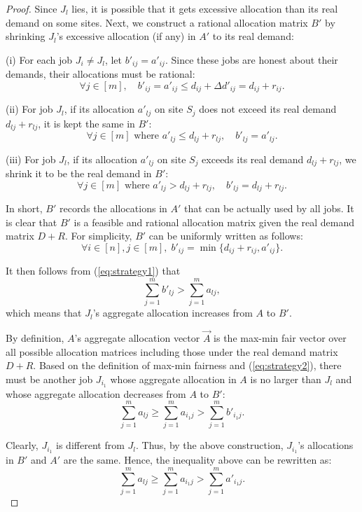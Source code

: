 \begin{proof}
Since $J_l$ lies, it is possible that it gets excessive allocation than its real demand on some sites. Next, we construct a rational allocation matrix $B'$ by shrinking $J_l$'s excessive allocation (if any) in $A'$ to its real demand:

(i) For each job $J_i \neq J_l$, let $b'_{ij} = a'_{ij}$. Since these jobs are honest about their demands, their allocations must be rational: 
$$\forall j \in [m], \quad b'_{ij} = a'_{ij} \leq d_{ij}+\Delta d'_{ij} = d_{ij}+ r_{ij}.$$

(ii) For job $J_l$, if its allocation $a'_{lj}$ on site $S_j$ does not exceed its real demand $d_{lj} + r_{lj}$, it is kept the same in $B'$:
$$\forall j \in[m] \text{~where~} a'_{lj} \leq d_{lj} + r_{lj}, \quad b'_{lj} = a'_{lj}.$$
    
(iii) For job $J_l$, if its allocation $a'_{lj}$ on site $S_j$ exceeds its real demand $d_{lj} + r_{lj}$, we shrink it to be the real demand in $B'$:
$$\forall j \in [m] \text{~where~} a'_{lj} > d_{lj} + r_{lj}, \quad b'_{lj} = d_{lj} + r_{lj}.$$

In short, $B'$ records the allocations in $A'$ that can be actually used by all jobs. It is clear that $B'$ is a feasible and rational allocation matrix given the real demand matrix $D + R$.
For simplicity, $B'$ can be uniformly written as follows:
$$
\forall i \in [n], j \in [m], \; b'_{ij} = \min\{d_{ij}+r_{ij}, a'_{ij}\}.
$$

It then follows from (\ref{eq:strategy1}) that
\begin{equation}
\sum_{j=1}^m b'_{lj} >\sum_{j=1}^m a_{lj},
\label{eq:strategy2}
\end{equation}
which means that $J_l$'s aggregate allocation increases from $A$ to $B'$.

By definition, $A$'s aggregate allocation vector $\vec A$ is the max-min fair vector over all possible allocation matrices including those under the real demand matrix $D + R$. Based on the definition of max-min fairness and (\ref{eq:strategy2}), there must be another job $J_{i_1}$ whose aggregate allocation in $A$ is no larger than $J_l$ and whose aggregate allocation decreases from $A$ to $B'$:
$$
\sum_{j=1}^m a_{lj} \geq \sum_{j=1}^m a_{i_1j} > \sum_{j=1}^m b'_{i_1j}.
$$

Clearly, $J_{i_1}$ is different from $J_l$. Thus, by the above construction, $J_{i_1}$'s allocations in $B'$ and $A'$ are the same. Hence, the inequality above can be rewritten as:
\begin{equation}
\sum_{j=1}^m a_{lj} \geq \sum_{j=1}^m a_{i_1j} > \sum_{j=1}^m a'_{i_1j}.
\label{eq:strategy3}
\end{equation}


\end{proof}
